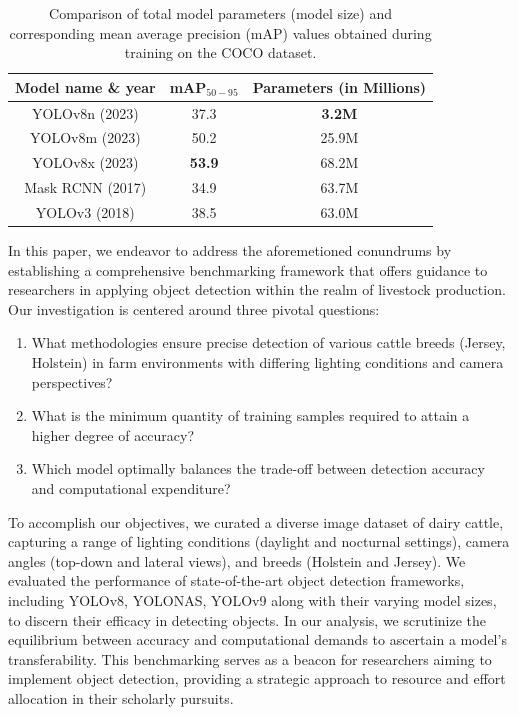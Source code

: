 \begin{table}[h!]
\centering
\begin{tabular}{|c|c|c|}
\hline
\textbf{Model name \& year} & \textbf{mAP}$_{50-95}$ & \textbf{Parameters (in Millions)} \\ \hline
YOLOv8n (2023)            & 37.3 & \textbf{3.2M} \\ \hline
YOLOv8m (2023)           & 50.2 & 25.9M \\ \hline
YOLOv8x (2023)            & \textbf{53.9} & 68.2M \\ \hline
Mask RCNN (2017)        & 34.9 & 63.7M \\ \hline
YOLOv3 (2018)            & 38.5 & 63.0M \\ \hline
\end{tabular}
\caption{Comparison of total model parameters (model size) and corresponding mean average precision (mAP) values obtained during training on the COCO dataset.}
\label{table:model-map-param}
\end{table}




In this paper, we endeavor to address the aforemetioned conundrums by establishing a comprehensive benchmarking framework that offers guidance to researchers in applying object detection within the realm of livestock production. Our investigation is centered around three pivotal questions:

\begin{enumerate} \label{contribution}
\item What methodologies ensure precise detection of various cattle breeds (Jersey, Holstein) in farm environments with differing lighting conditions and camera perspectives?
\item What is the minimum quantity of training samples required to attain a higher degree of accuracy?
\item Which model optimally balances the trade-off between detection accuracy and computational expenditure?
\end{enumerate}

To accomplish our objectives, we curated a diverse image dataset of dairy cattle, capturing a range of lighting conditions (daylight and nocturnal settings), camera angles (top-down and lateral views), and breeds (Holstein and Jersey). We evaluated the performance of state-of-the-art object detection frameworks, including YOLOv8, YOLONAS, YOLOv9 along with their varying model sizes, to discern their efficacy in detecting objects. In our analysis, we scrutinize the equilibrium between accuracy and computational demands to ascertain a model’s transferability. This benchmarking serves as a beacon for researchers aiming to implement object detection, providing a strategic approach to resource and effort allocation in their scholarly pursuits.





